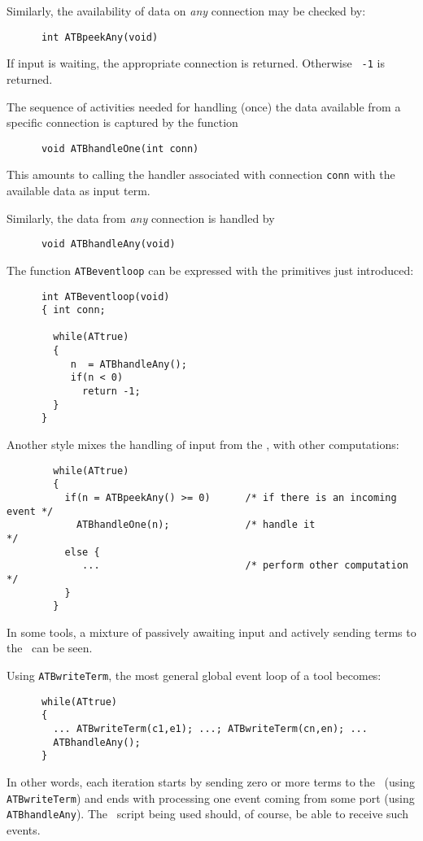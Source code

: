 \documentclass[twoside]{article} %
\begin{document}
Similarly, the availability of data on \emph{any} connection may be checked
by:
\begin{verbatim}
      int ATBpeekAny(void)
\end{verbatim}
If input is waiting, the appropriate connection is returned. Otherwise {\tt
  -1} is returned.

The sequence of activities needed for handling (once) the data available from
a specific connection is captured by the function
\begin{verbatim}
      void ATBhandleOne(int conn)
\end{verbatim}
This amounts to calling the handler associated with connection {\tt conn}
with the available data as input term.

Similarly, the data from \emph{any} connection is handled by
\begin{verbatim}
      void ATBhandleAny(void)
\end{verbatim}

The function {\tt ATBeventloop} can be expressed with the primitives just
introduced:

\begin{verbatim}
      int ATBeventloop(void)
      { int conn;

        while(ATtrue)
        {
           n  = ATBhandleAny();
           if(n < 0)
             return -1;
        }
      }
\end{verbatim}
Another style mixes the handling of input from the \TB, with other
computations:
\begin{verbatim}
        while(ATtrue)
        { 
          if(n = ATBpeekAny() >= 0)      /* if there is an incoming event */
            ATBhandleOne(n);             /* handle it                     */
          else {
             ...                         /* perform other computation     */
          }
        }
\end{verbatim}

In some tools, a mixture of passively awaiting input
and actively sending terms to the \TB\ can be seen.

Using {\tt ATBwriteTerm}, the most general global event loop of a tool becomes:

\begin{verbatim}
      while(ATtrue)
      {
        ... ATBwriteTerm(c1,e1); ...; ATBwriteTerm(cn,en); ...
        ATBhandleAny();
      }
\end{verbatim}

In other words, each iteration starts by sending zero or more terms
to the \TB\ (using {\tt ATBwriteTerm}) and ends with processing one event
coming from some port (using {\tt ATBhandleAny}).  The \T\ script being used
should, of course, be able to receive such events.
\end{document}
